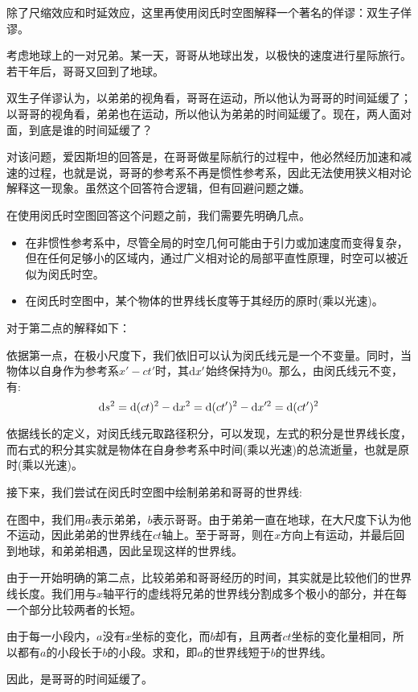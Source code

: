 除了尺缩效应和时延效应，这里再使用闵氏时空图解释一个著名的佯谬：双生子佯谬。

\begin{ex}[双生子佯谬]
	考虑地球上的一对兄弟。某一天，哥哥从地球出发，以极快的速度进行星际旅行。若干年后，哥哥又回到了地球。
	
	双生子佯谬认为，以弟弟的视角看，哥哥在运动，所以他认为哥哥的时间延缓了；以哥哥的视角看，弟弟也在运动，所以他认为弟弟的时间延缓了。现在，两人面对面，到底是谁的时间延缓了？
\end{ex}
\begin{so}[双生子佯谬]
	对该问题，爱因斯坦的回答是，在哥哥做星际航行的过程中，他必然经历加速和减速的过程，也就是说，哥哥的参考系不再是惯性参考系，因此无法使用狭义相对论解释这一现象。虽然这个回答符合逻辑，但有回避问题之嫌。
	
	在使用闵氏时空图回答这个问题之前，我们需要先明确几点。
	\begin{itemize}
		\item 在非惯性参考系中，尽管全局的时空几何可能由于引力或加速度而变得复杂，但在任何足够小的区域内，通过广义相对论的局部平直性原理，时空可以被近似为闵氏时空。
		\item 在闵氏时空图中，某个物体的世界线长度等于其经历的原时(乘以光速)。
	\end{itemize}
	
	对于第二点的解释如下：
	
	依据第一点，在极小尺度下，我们依旧可以认为闵氏线元是一个不变量。同时，当物体以自身作为参考系$x'-ct'$时，其$\dif x'$始终保持为$0$。那么，由闵氏线元不变，有:
	\begin{equation}
		\dif s^2=\dif(ct)^2-\dif x^2 = \dif (ct')^2-\dif x'^2 = \dif(ct')^2
	\end{equation}
	
	依据线长的定义，对闵氏线元取路径积分，可以发现，左式的积分是世界线长度，而右式的积分其实就是物体在自身参考系中时间(乘以光速)的总流逝量，也就是原时(乘以光速)。
	
	接下来，我们尝试在闵氏时空图中绘制弟弟和哥哥的世界线:
	
	在图中，我们用$a$表示弟弟，$b$表示哥哥。由于弟弟一直在地球，在大尺度下认为他不运动，因此弟弟的世界线在$ct$轴上。至于哥哥，则在$x$方向上有运动，并最后回到地球，和弟弟相遇，因此呈现这样的世界线。
	
	由于一开始明确的第二点，比较弟弟和哥哥经历的时间，其实就是比较他们的世界线长度。我们用与$x$轴平行的虚线将兄弟的世界线分割成多个极小的部分，并在每一个部分比较两者的长短。
	
	由于每一小段内，$a$没有$x$坐标的变化，而$b$却有，且两者$ct$坐标的变化量相同，所以都有$a$的小段长于$b$的小段。求和，即$a$的世界线短于$b$的世界线。
	
	因此，是哥哥的时间延缓了。
\end{so}
	